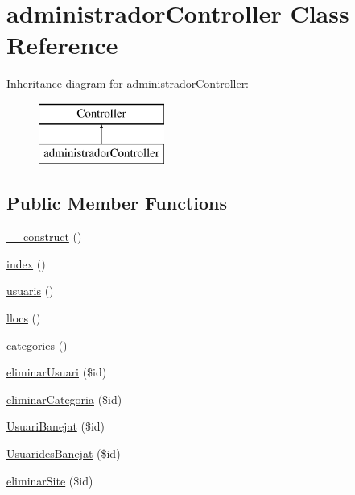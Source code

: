 \hypertarget{classadministrador_controller}{}\section{administrador\+Controller Class Reference}
\label{classadministrador_controller}
Inheritance diagram for administrador\+Controller\+:\begin{figure}[H]
\begin{center}
\leavevmode
\includegraphics[height=2.000000cm]{classadministrador_controller}
\end{center}
\end{figure}
\subsection*{Public Member Functions}
\begin{DoxyCompactItemize}
\item 
\hyperlink{classadministrador_controller_a095c5d389db211932136b53f25f39685}{\+\_\+\+\_\+construct} ()
\item 
\hyperlink{classadministrador_controller_a149eb92716c1084a935e04a8d95f7347}{index} ()
\item 
\hyperlink{classadministrador_controller_a5d19ca59029ccc579492bf733a5f48ad}{usuaris} ()
\item 
\hyperlink{classadministrador_controller_aeb4cad59ef567c8ff23ea1df9a022901}{llocs} ()
\item 
\hyperlink{classadministrador_controller_a387bdb0e925ab2459d5ede3b5cb1a98e}{categories} ()
\item 
\hyperlink{classadministrador_controller_a3770680f7168ff17e7d3bbddc27bc5df}{eliminar\+Usuari} (\$id)
\item 
\hyperlink{classadministrador_controller_a2616775d2f8dc4aa3103033556633115}{eliminar\+Categoria} (\$id)
\item 
\hyperlink{classadministrador_controller_ac9d26ea53762f0641d04edc63e240dd9}{Usuari\+Banejat} (\$id)
\item 
\hyperlink{classadministrador_controller_abe679e9e8d662237b06086b4962d15fe}{Usuarides\+Banejat} (\$id)
\item 
\hyperlink{classadministrador_controller_ace815abff98c1ce2c21b0402a857120d}{eliminar\+Site} (\$id)
\end{DoxyCompactItemize}
